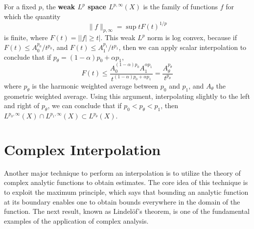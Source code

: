 \begin{example}
	For a fixed $p$, the {\bf weak $L^p$ space $L^{p,\infty}(X)$} is the family of functions $f$ for which the quantity
	\[ \| f \|_{p,\infty} = \sup t F(t)^{1/p} \]
	is finite, where $F(t) = ||f| \geq t|$. This weak $L^p$ norm is log convex, because if $F(t) \leq A_0^{p_0}/t^{p_0}$, and $F(t) \leq A_1^{p_1}/t^{p_1}$, then we can apply scalar interpolation to conclude that if $p_\theta = (1 - \alpha) p_0 + \alpha p_1$,
	\[ F(t) \leq \frac{A_0^{(1 - \alpha) p_0}A_1^{\alpha p_1}}{t^{(1 - \alpha)p_0 + \alpha p_1}} = \frac{A_\theta^{p_\theta}}{t^{p_\theta}} \]
	where $p_\theta$ is the harmonic weighted average between $p_0$ and $p_1$, and $A_\theta$ the geometric weighted average. Using this argument, interpolating slightly to the left and right of $p_\theta$, we can conclude that if $p_0 < p_\theta < p_1$, then $L^{p_0,\infty}(X) \cap L^{p_1,\infty}(X) \subset L^{p_\theta}(X)$.
\end{example}

\section{Complex Interpolation}

Another major technique to perform an interpolation is to utilize the theory of complex analytic functions to obtain estimates. The core idea of this technique is to exploit the maximum principle, which says that bounding an analytic function at its boundary enables one to obtain bounds everywhere in the domain of the function. The next result, known as Lindel\"{o}f's theorem, is one of the fundamental examples of the application of complex analysis.

